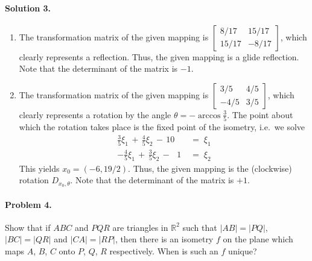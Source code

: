 \documentclass[10pt]{article}
\begin{document}
        \paragraph{Solution 3.}
        \begin{enumerate}
                \item The transformation matrix of the given mapping is 
                $
                \begin{bmatrix}
                        {8}/{17} & {15}/{17}  \\ {15}/{17} & -{8}/{17}
                \end{bmatrix}
                $,
                which clearly represents a reflection. Thus, the given mapping is a glide reflection.
                Note that the determinant of the matrix is $-1$.
                \item The transformation matrix of the given mapping is 
                $
                \begin{bmatrix}
                        {3}/{5} & {4}/{5}  \\ -{4}/{5} & {3}/{5}
                \end{bmatrix}
                $,
                which clearly represents a rotation by the angle $\theta = -\arccos\frac{3}{5}$.
                The point about which the rotation takes place is the fixed point of the isometry, i.e.\ we solve
                \begin{align*}
                        \frac{3}{5}\xi_1 \,+\, \frac{4}{5}\xi_2 \,-\, 10 \;&=\; \xi_1 \\
                        -\frac{4}{5}\xi_1 \,+\, \frac{3}{5}\xi_2 \,-\,\;\: 1\;&=\; \xi_2
                \end{align*}
                This yields $x_0 = (-6, 19 /2)$. Thus, the given mapping is the (clockwise) rotation $D_{x_0, \theta}$.
                Note that the determinant of the matrix is $+1$.
        \end{enumerate}

        \paragraph{Problem 4.} Show that if $ABC$ and $PQR$ are triangles in $\mathbb{R}^2$ such that $|AB| = |PQ|$, 
        $|BC| = |QR|$ and $|CA| = |RP|$, then there is an isometry $f$ on the plane which maps $A$, $B$, $C$ onto
        $P$, $Q$, $R$ respectively. When is such an $f$ unique?
\end{document}
